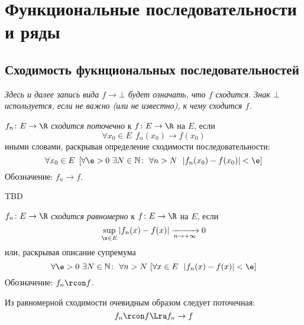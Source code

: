 \chapter{Функциональные последовательности и ряды}

\section{Сходимость фукнциональных последовательностей}

\begin{remark}
    \textit{Здесь и далее запись вида $f \to \bot$ будет означать, что $f$
    сходится. Знак $\bot$ используется, если не важно (или не известно), к чему
    сходится $f$.}
\end{remark}

\begin{definition}
    $f_n \colon E \to \R$ \textit{сходится поточечно} к $f \colon E \to \R$ на
    $E$, если
\[
    \forall x_0 \in E~~ f_n(x_0) \to f(x_0)
\]
    иными словами, раскрывая определение сходимости последовательности:
\[
    \forall x_0 \in E~ \left[ \forall \e > 0~ \exists N \in \mathbb{N}\colon~
    \forall n > N~~ |f_n(x_0) - f(x_0)| < \e \right]
\]
    Обозначение: $f_n \to f$.
\end{definition}

\begin{examples}
    TBD
\end{examples}

\begin{definition}
    $f_n \colon E \to \R$ \textit{сходится равномерно} к $f \colon E \to \R$ на
    $E$, если
\[
    \sup_{\x \in E}|f_n(x) - f(x)| \xrightarrow[n \to +\infty]{} 0
\]
    или, раскрывая описание супремума
\[
    \forall \e > 0~ \exists N \in \mathbb{N}\colon~ \forall n > N~ [\forall x \in
    E~~ |f_n(x) - f(x)| < \e]
\]
    Обозначение: $f_n \rcon f$.
\end{definition}

\begin{remark}
    Из равномерной сходимости очевидным образом следует поточечная:
\[
    f_n \rcon f \Lra f_n \to f
\]
\end{remark}

